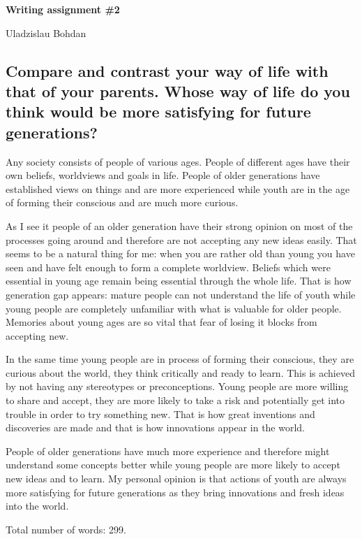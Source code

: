 \documentclass[12pt]{article}
\begin{document}
{\Large

\textbf{Writing assignment \#2}

Uladzislau Bohdan

}

\vspace{10mm}

\subsection*{Compare and contrast your way of life with that of your parents.
Whose way of life do you think would be more satisfying for future generations?}

Any society consists of people of various ages. People of different ages have
their own beliefs, worldviews and goals in life.
People of older generations have established views on things and are more experienced
while youth are in the age of forming their conscious and are much more curious.

As I see it people of an older generation have their strong opinion on most of
the processes going around and therefore are not accepting any new ideas easily.
That seems to be a natural thing for me: when you are rather old than young you have seen
and have felt enough to form a complete worldview. Beliefs which were essential
in young age remain being essential through the whole life. That is how generation gap
appears: mature people can not understand the life of youth while young people
are completely unfamiliar with what is valuable for older people. Memories about
young ages are so vital that fear of losing it blocks from accepting new.

In the same time young people are in process of forming their conscious, they are
curious about the world, they think critically and ready to learn. This is achieved
by not having any stereotypes or preconceptions. Young people are more willing
to share and accept, they are more likely to take a risk and potentially get into trouble
in order to try something new. That is how great inventions and discoveries are made
and that is how innovations appear in the world.

People of older generations have much more experience and therefore might
understand some concepts better while young people are more likely to accept new ideas
and to learn. My personal opinion is that actions of youth are always
more satisfying for future generations as they bring innovations and fresh ideas
into the world.

\vspace{15mm}

Total number of words: 299.
\end{document}
